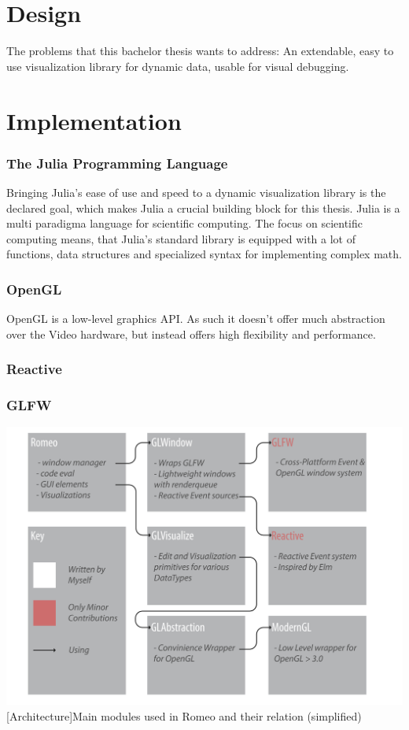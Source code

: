 \section{Design}
The problems that this bachelor thesis wants to address:
An extendable, easy to use visualization library for dynamic data, usable for visual debugging.



\section{Implementation}



\subsubsection{The Julia Programming Language}
Bringing Julia's ease of use and speed to a dynamic visualization library is the declared goal, which makes Julia a crucial building block for this thesis.
Julia is a multi paradigma language for scientific computing.
The focus on scientific computing means, that Julia's standard library is equipped with a lot of functions, data structures and specialized syntax for implementing complex math.


\subsubsection{OpenGL}
OpenGL is a low-level graphics API. As such it doesn't offer much abstraction over the Video hardware, but instead offers high flexibility and performance.


\subsubsection{Reactive}
\subsubsection{GLFW}


\vspace{1em}
\begin{minipage}{\linewidth}
    \centering
    \includegraphics[width=0.9\linewidth]{graphics/architecture.pdf}
    [Architecture]{Main modules used in Romeo and their relation (simplified)}
    \label{fig:architecture} 
\end{minipage}


